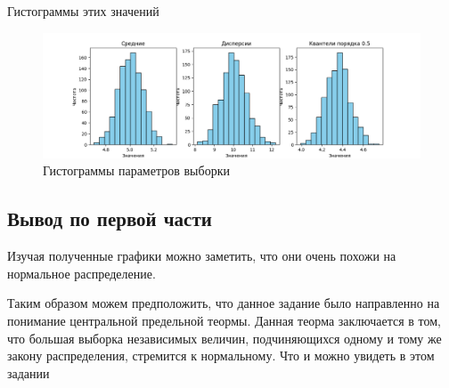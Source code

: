 \documentclass{article}
\begin{document}
Гистограммы этих значений
\begin{figure}[H]
      \centering
      \includegraphics[width=1\linewidth]{Python/first-exp}
      \caption{Гистограммы параметров выборки}\label{fig:figure}
\end{figure}

\subsection{Вывод по первой части}\label{subsec:---2}
Изучая полученные графики можно заметить, что они очень похожи на нормальное распределение.

Таким образом можем предположить, что данное задание было направленно на понимание центральной предельной теормы.
Данная теорма заключается в том, что большая выборка независимых величин, подчиняющихся одному и тому же закону распределения, стремится к нормальному.
Что и можно увидеть в этом задании
\end{document}
